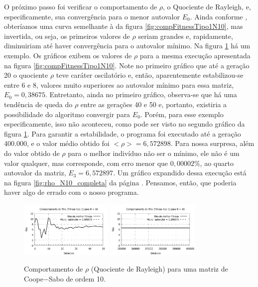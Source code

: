	O próximo passo foi verificar o comportamento de $\rho$, o Quociente de Rayleigh, e, especificamente, sua convergência para o menor autovalor $E_0$. Ainda conforme \cite{metodo2004}, obteríamos uma curva semelhante à da figura \ref{fig:compFitnessTipo1N10}, mas invertida, ou seja, os primeiros valores de $\rho$ seriam grandes e, rapidamente, diminuiriam até haver convergência para o autovalor mínimo. Na figura \ref{fig:rho_N10} há um exemplo.	Os gráficos exibem os valores de $\rho$ para a mesma execução apresentada na figura \ref{fig:compFitnessTipo1N10}. Note no primeiro gráfico que até a geração 20 o quociente $\rho$ teve caráter oscilatório e, então, aparentemente estabilizou-se entre 6 e 8, valores muito superiores ao autovalor mínimo para essa matriz, $E_0 = 0,38675$. Entretanto, ainda no primeiro gráfico, observa-se que há uma tendência de queda do $\rho$ entre as gerações 40 e 50 e, portanto, existiria a possibilidade do algoritmo convergir para $E_0$. Porém, para esse exemplo especificamente, isso não aconteceu, como pode ser visto no segundo gráfico da figura \ref{fig:rho_N10}. Para garantir a estabilidade, o programa foi executado até a geração 400.000, e o valor médio obtido foi $<\rho> = 6,572898$. Para nossa surpresa, além do valor obtido de $\rho$ para o melhor indivíduo não ser o mínimo, ele não é um valor qualquer, mas corresponde, com erro menor que $0,00002\%$, ao quarto autovalor da matriz, $E_3 = 6,572897$. Um gráfico expandido dessa execução está na figura \ref{fig:rho_N10_completa} da página \pageref{fig:rho_N10_completa}. Pensamos, então, que poderia haver algo de errado com o nosso programa. 
	
	\begin{figure}[htbp]
		\centering
			\includegraphics[width=0.40\textwidth]{figs/resultados/rho_N10_g50.pdf}
			\includegraphics[width=0.40\textwidth]{figs/resultados/rho_N10_g400000.pdf}
		\caption{Comportamento de $\rho$ (Quociente de Rayleigh) para uma matriz de Coope$-$Sabo de ordem 10.}
		\label{fig:rho_N10}
	\end{figure}
	
